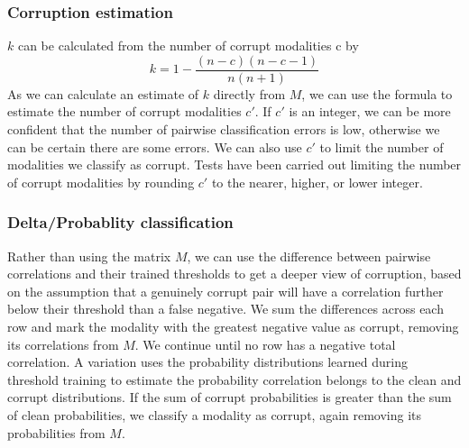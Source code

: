 \subsubsection{Corruption estimation}
$k$ can be calculated from the number of corrupt modalities c by 
$$
k = 1-\frac{(n-c)(n-c-1)}{n(n+1)}
$$
As we can calculate an estimate of $k$ directly from $M$, we can use the formula to estimate the number of corrupt modalities $c'$. If $c'$ is an integer, we can be more confident that the number of pairwise classification errors is low, otherwise we can be certain there are some errors. We can also use $c'$ to limit the number of modalities we classify as corrupt. Tests have been carried out limiting the number of corrupt modalities by rounding $c'$ to the nearer, higher, or lower integer.

\subsubsection{Delta/Probablity classification}
Rather than using the matrix $M$, we can use the difference between pairwise correlations and their trained thresholds to get a deeper view of corruption, based on the assumption that a genuinely corrupt pair will have a correlation further below their threshold than a false negative. We sum the differences across each row and mark the modality with the greatest negative value as corrupt, removing its correlations from $M$. We continue until no row has a negative total correlation. A variation uses the probability distributions learned during threshold training to estimate the probability correlation belongs to the clean and corrupt distributions. If the sum of corrupt probabilities is greater than the sum of clean probabilities, we classify a modality as corrupt, again removing its probabilities from $M$.

